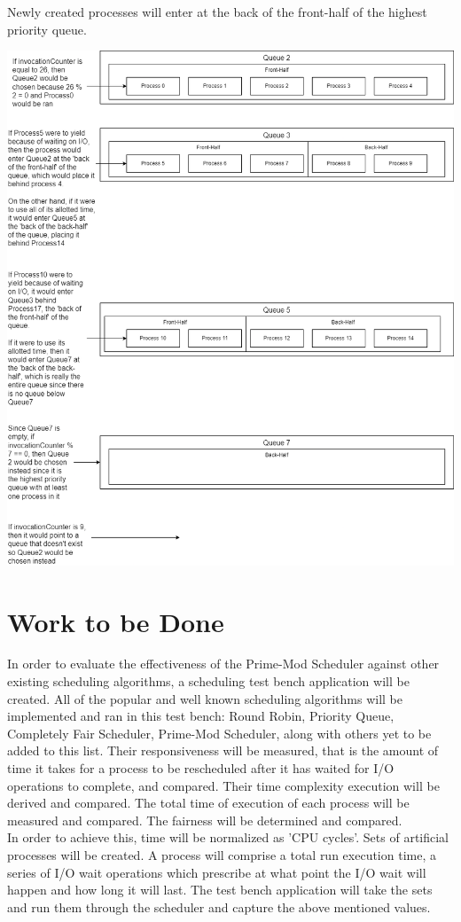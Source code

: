 \documentclass[12pt]{article}
\begin{document}
	Newly created processes will enter at the back of the front-half of the highest priority queue.
	
	\begin{center}
		\includegraphics[scale=.45]{./diagram.png}
	\end{center}
	
	\section*{Work to be Done}
	In order to evaluate the effectiveness of the Prime-Mod Scheduler against other existing scheduling algorithms, a scheduling test bench application will be created.
	All of the popular and well known scheduling algorithms will be implemented and ran in this test bench: Round Robin, Priority Queue, Completely Fair Scheduler, Prime-Mod Scheduler, along with others yet to be added to this list.
	Their responsiveness will be measured, that is the amount of time it takes for a process to be rescheduled after it has waited for I/O operations to complete, and compared.
	Their time complexity execution will be derived and compared.
	The total time of execution of each process will be measured and compared.
	The fairness will be determined and compared.\\
	
	In order to achieve this, time will be normalized as 'CPU cycles'.
	Sets of artificial processes will be created.
	A process will comprise a total run execution time, a series of I/O wait operations which prescribe at what point the I/O wait will happen and how long it will last.
	The test bench application will take the sets and run them through the scheduler and capture the above mentioned values.
		
\end{document}
